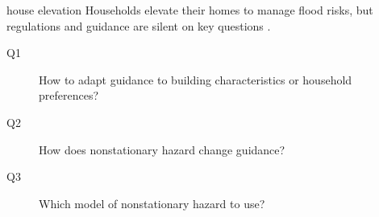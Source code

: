 \begin{block}{house elevation}
    Households elevate their homes to manage flood risks, but regulations and guidance are silent on key questions \cite{zarekarizi_suboptimal:2020,xian_elevation:2017}.
    \vspace*{-1em}
    \begin{description}
        \item[Q1] How to adapt guidance to building characteristics or household preferences?
        \item[Q2] How does nonstationary hazard change guidance?
        \item[Q3] Which model of nonstationary hazard to use?
    \end{description}
    \begin{framed}
        \begin{figure}
            \centering
            \hfill%
            \\

\end{figure}
\end{framed}
\end{block}
